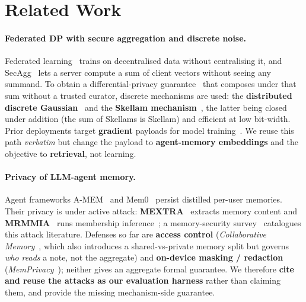 \documentclass[pdflatex,sn-mathphys-num,12pt]{sn-jnl}
\theoremstyle{thmstyleone}%
\theoremstyle{thmstyletwo}%
\theoremstyle{thmstylethree}%
\begin{document}
\section{Related Work}\label{sec:related}

\paragraph{Federated DP with secure aggregation and discrete noise.}
Federated learning~\cite{mcmahan2017fedavg} trains on decentralised data without
centralising it, and SecAgg~\cite{bonawitz2017secagg} lets a server compute a sum
of client vectors without seeing any summand. To obtain a differential-privacy
guarantee~\cite{dwork2014foundations} that composes under that sum without a
trusted curator, discrete mechanisms are used:
the \textbf{distributed discrete Gaussian}~\cite{kairouz2021ddgauss} and the
\textbf{Skellam mechanism}~\cite{agarwal2021skellam}, the latter being closed
under addition (the sum of Skellams is Skellam) and efficient at low bit-width.
Prior deployments target \textbf{gradient} payloads for model
training~\cite{abadi2016dpsgd}. We reuse this path \emph{verbatim} but change the
payload to \textbf{agent-memory embeddings} and the objective to
\textbf{retrieval}, not learning.

\paragraph{Privacy of LLM-agent memory.}
Agent frameworks A-MEM~\cite{xu2024amem} and Mem0~\cite{chhikara2024mem0} persist
distilled per-user memories. Their privacy is under active attack:
\textbf{MEXTRA}~\cite{wang2025mextra} extracts memory content and
\textbf{MRMMIA}~\cite{chen2026mrmmia} runs membership inference~\cite{shokri2017mia}; a
memory-security survey~\cite{lin2026survey} catalogues this attack literature.
Defenses so far are \textbf{access control} (\emph{Collaborative
Memory}~\cite{rezazadeh2025collabmem}, which also introduces a
shared-vs-private memory split but governs \emph{who reads} a note, not the
aggregate) and \textbf{on-device masking / redaction}
(\emph{MemPrivacy}~\cite{chen2026memprivacy}); neither gives an aggregate formal
guarantee. We therefore \textbf{cite and reuse the attacks as our evaluation
harness} rather than claiming them, and provide the missing mechanism-side
guarantee.
\end{document}
